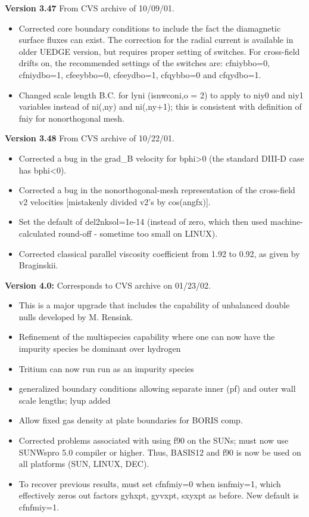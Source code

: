 \documentclass [12pt]{article}
\begin{document}
\noindent\textbf{Version 3.47} From CVS archive of 10/09/01.
\begin{itemize}
    \item Corrected core boundary conditions to include the fact the
          diamagnetic surface fluxes can exist.  The correction for the 
          radial current is available in older UEDGE version, but
          requires proper setting of switches.  For cross-field drifts
          on, the recommended settings of the switches are:
          cfniybbo=0, cfniydbo=1, cfeeybbo=0, cfeeydbo=1,
          cfqybbo=0 and cfqydbo=1.
   \item Changed scale length B.C. for
         lyni (isnwconi,o = 2) to apply to niy0 and niy1 variables
         instead of ni(,ny) and ni(,ny+1); this is consistent with
         definition of fniy for nonorthogonal mesh.
\end{itemize}


\noindent\textbf{Version 3.48}   From CVS archive of 10/22/01.
\begin{itemize}
   \item Corrected a bug in the grad\_B velocity for bphi>0 (the
                standard DIII-D case has bphi<0).  
   \item Corrected a bug
         in the nonorthogonal-mesh representation of the cross-field
         v2 velocities [mistakenly divided v2's by cos(angfx)].  
   \item Set the default of del2nksol=1e-14 (instead of zero, which then
         used machine-calculated round-off - sometime too small on 
         LINUX). 
   \item Corrected classical parallel viscosity coefficient
          from 1.92 to 0.92, as given by Braginskii.
\end{itemize}

\noindent\textbf{Version 4.0:}  Corresponds to CVS archive on 01/23/02.  
\begin{itemize}
   \item This is a major upgrade that includes the capability of 
         unbalanced double nulls developed by M. Rensink.
   \item Refinement of the multispecies capability where one can
         now have the impurity species be dominant over hydrogen
   \item Tritium can now run run as an impurity species
   \item generalized boundary conditions allowing separate inner (pf)
         and outer wall scale lengths; lyup added
   \item Allow fixed gas density at plate boundaries for BORIS comp.
   \item Corrected problems associated with using f90 on the SUNs;
          must now use SUNWspro 5.0 compiler or higher.  Thus, BASIS12
          and f90 is now be used on all platforms (SUN, LINUX, DEC).
   \item To recover previous results, must set cfnfmiy=0 when isnfmiy=1,
         which effectively zeros out factors gyhxpt, gyvxpt, sxyxpt as
         before.  New default is cfnfmiy=1.
\end{itemize} 
 
\end{document}
